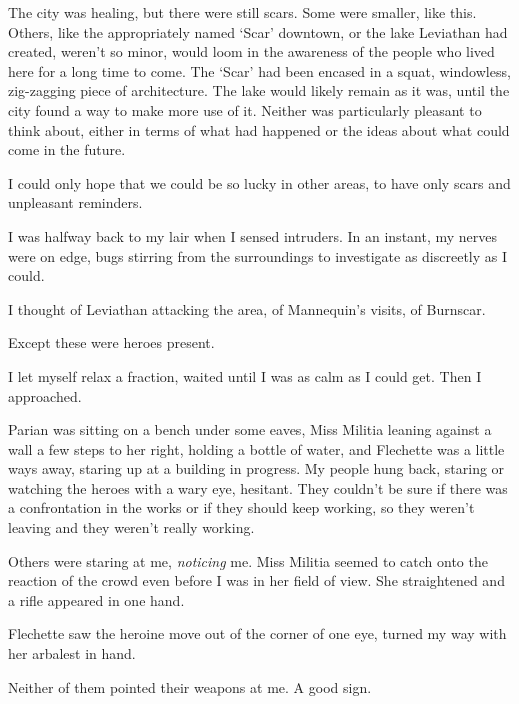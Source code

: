 The city was healing, but there were still scars.  Some were smaller, like this.  Others, like the appropriately named `Scar' downtown, or the lake Leviathan had created, weren't so minor, would loom in the awareness of the people who lived here for a long time to come.  The `Scar' had been encased in a squat, windowless, zig-zagging piece of architecture.  The lake would likely remain as it was, until the city found a way to make more use of it.  Neither was particularly pleasant to think about, either in terms of what had happened or the ideas about what could come in the future.



I could only hope that we could be so lucky in other areas, to have only scars and unpleasant reminders.



I was halfway back to my lair when I sensed intruders.  In an instant, my nerves were on edge, bugs stirring from the surroundings to investigate as discreetly as I could.



I thought of Leviathan attacking the area, of Mannequin's visits, of Burnscar.



Except these were heroes present.



I let myself relax a fraction, waited until I was as calm as I could get.  Then I approached.



Parian was sitting on a bench under some eaves, Miss Militia leaning against a wall a few steps to her right, holding a bottle of water, and Flechette was a little ways away, staring up at a building in progress.  My people hung back, staring or watching the heroes with a wary eye, hesitant.  They couldn't be sure if there was a confrontation in the works or if they should keep working, so they weren't leaving and they weren't really working.



Others were staring at me, \emph{noticing} me.  Miss Militia seemed to catch onto the reaction of the crowd even before I was in her field of view.  She straightened and a rifle appeared in one hand.



Flechette saw the heroine move out of the corner of one eye, turned my way with her arbalest in hand.



Neither of them pointed their weapons at me.  A good sign.



